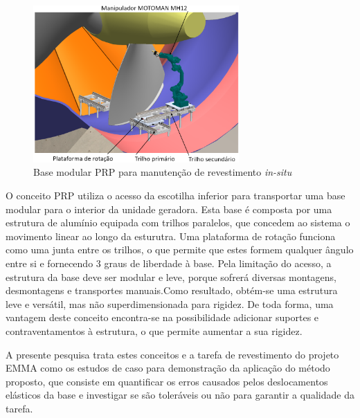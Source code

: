 \begin{figure}[h]
	\centering 
 	\includegraphics[width=0.70\textwidth]{figs/prp_turbina}
 	\caption{Base modular PRP para manutenção de revestimento \textit{in-situ}}
 	\label{fig::prp_turbina}
\end{figure}

O conceito PRP utiliza o acesso da escotilha inferior para transportar uma base
modular para o interior da unidade geradora. Esta base é composta por uma
estrutura de alumínio equipada com trilhos paralelos, que concedem ao sistema o
movimento linear ao longo da esturutra. Uma plataforma de rotação funciona como
uma junta entre os trilhos, o que permite que estes formem qualquer ângulo entre
si e fornecendo 3 graus de liberdade à base. Pela limitação do acesso, a
estrutura da base deve ser modular e leve, porque sofrerá diversas montagens,
desmontagens e transportes manuais.Como resultado, obtém-se uma estrutura leve e
versátil, mas não superdimensionada para rigidez. De toda forma, uma vantagem
deste conceito encontra-se na possibilidade adicionar suportes e
contraventamentos à estrutura, o que permite aumentar a sua rigidez.

A presente pesquisa trata estes conceitos e a tarefa de revestimento do projeto
EMMA como os estudos de caso para demonstração da aplicação do método proposto,
que consiste em quantificar os erros causados pelos deslocamentos elásticos da
base e investigar se são toleráveis ou não para garantir a qualidade da tarefa.


















